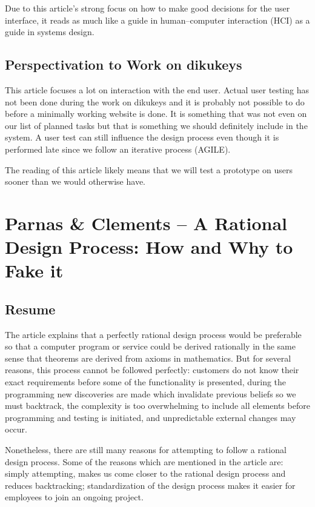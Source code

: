 \documentclass[11pt,a4paper]{report}
\begin{document}
Due to this article's strong focus on how to make good decisions for the user interface, it reads as much like a guide in human–computer interaction (HCI) as a guide in systems design.
\subsection{Perspectivation to Work on dikukeys}
This article focuses a lot on interaction with the end user. Actual user testing has not been done during the work on dikukeys and it is probably not possible to do before a minimally working website is done. It is something that was not even on our list of planned tasks but that is something we should definitely include in the system. A user test can still influence the design process even though it is performed late since we follow an iterative process (AGILE). 

The reading of this article likely means that we will test a prototype on users sooner than we would otherwise have.

\section{Parnas \& Clements -- A Rational Design Process: How and Why to
Fake it}
\subsection{Resume}
The article explains that a perfectly rational design process would be preferable so that a computer program or service could be derived rationally in the same sense that theorems are derived from axioms in mathematics. But for several reasons, this process cannot be followed perfectly: customers do not know their exact requirements before some of the functionality is presented, during the programming new discoveries are made which invalidate previous beliefs so we must backtrack, the complexity is too overwhelming to include all elements before programming and testing is initiated, and unpredictable external changes may occur.

Nonetheless, there are still many reasons for attempting to follow a rational design process. Some of the reasons which are mentioned in the article are: simply attempting, makes us come closer to the rational design process and reduces backtracking; standardization of the design process makes it easier for employees to join an ongoing project.
\end{document}
